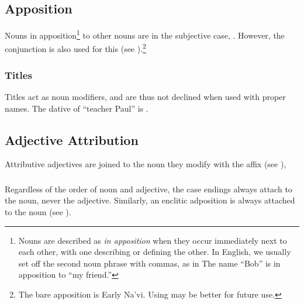 \noindent{}

\subsection{Apposition} Nouns in apposition\footnote{Nouns are
described as \textit{in apposition} when they occur immediately next
to each other, with one describing or defining the other.  In English,
we usually set off the second noun phrase with commas, as in   The name
``Bob'' is in apposition to ``my friend.''}
to other nouns are in the subjective case,  .  However, the con\-junct\-ion  is
also used for this (see ).\footnote{The bare
apposition is Early Na'vi.  Using  may be better for future
use.} 

\subsubsection{Titles} Titles act as noun modifiers, and are thus not
declined when used with proper names.  The dative of 
``teacher Paul'' is . 

\subsection{Adjective Attribution} Attributive adjectives are joined
to the noun they modify with the affix  (see
),     \label{syn:adj:attr}

\subsubsection{} Regardless of the order of noun and adjective, the
case endings always attach to the noun, never the adjective.
Similarly, an enclitic adposition is always attached to the noun
(see ).

